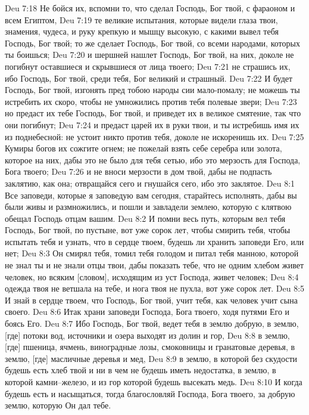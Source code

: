 Deu 7:18  Не бойся их, вспомни то, что сделал Господь, Бог твой, с фараоном и всем Египтом,
Deu 7:19  те великие испытания, которые видели глаза твои, знамения, чудеса, и руку крепкую и мышцу высокую, с какими вывел тебя Господь, Бог твой; то же сделает Господь, Бог твой, со всеми народами, которых ты боишься;
Deu 7:20  и шершней нашлет Господь, Бог твой, на них, доколе не погибнут оставшиеся и скрывшиеся от лица твоего;
Deu 7:21  не страшись их, ибо Господь, Бог твой, среди тебя, Бог великий и страшный.
Deu 7:22  И будет Господь, Бог твой, изгонять пред тобою народы сии мало-помалу; не можешь ты истребить их скоро, чтобы не умножились против тебя полевые звери;
Deu 7:23  но предаст их тебе Господь, Бог твой, и приведет их в великое смятение, так что они погибнут;
Deu 7:24  и предаст царей их в руки твои, и ты истребишь имя их из поднебесной: не устоит никто против тебя, доколе не искоренишь их.
Deu 7:25  Кумиры богов их сожгите огнем; не пожелай взять себе серебра или золота, которое на них, дабы это не было для тебя сетью, ибо это мерзость для Господа, Бога твоего;
Deu 7:26  и не вноси мерзости в дом твой, дабы не подпасть заклятию, как она; отвращайся сего и гнушайся сего, ибо это заклятое.
Deu 8:1  Все заповеди, которые я заповедую вам сегодня, старайтесь исполнять, дабы вы были живы и размножились, и пошли и завладели землею, которую с клятвою обещал Господь отцам вашим.
Deu 8:2  И помни весь путь, которым вел тебя Господь, Бог твой, по пустыне, вот уже сорок лет, чтобы смирить тебя, чтобы испытать тебя и узнать, что в сердце твоем, будешь ли хранить заповеди Его, или нет;
Deu 8:3  Он смирял тебя, томил тебя голодом и питал тебя манною, которой не знал ты и не знали отцы твои, дабы показать тебе, что не одним хлебом живет человек, но всяким [словом], исходящим из уст Господа, живет человек;
Deu 8:4  одежда твоя не ветшала на тебе, и нога твоя не пухла, вот уже сорок лет.
Deu 8:5  И знай в сердце твоем, что Господь, Бог твой, учит тебя, как человек учит сына своего.
Deu 8:6  Итак храни заповеди Господа, Бога твоего, ходя путями Его и боясь Его.
Deu 8:7  Ибо Господь, Бог твой, ведет тебя в землю добрую, в землю, [где] потоки вод, источники и озера выходят из долин и гор,
Deu 8:8  в землю, [где] пшеница, ячмень, виноградные лозы, смоковницы и гранатовые деревья, в землю, [где] масличные деревья и мед,
Deu 8:9  в землю, в которой без скудости будешь есть хлеб твой и ни в чем не будешь иметь недостатка, в землю, в которой камни--железо, и из гор которой будешь высекать медь.
Deu 8:10  И когда будешь есть и насыщаться, тогда благословляй Господа, Бога твоего, за добрую землю, которую Он дал тебе.
